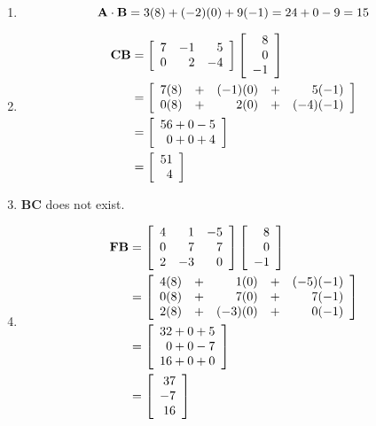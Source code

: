 \documentclass[12pt]{article}
\begin{document}
\begin{enumerate}
\item $$\textrm{\textbf{A}} \cdot \textrm{\textbf{B}} = 3(8) + (-2)(0) + 9(-1) = 24 + 0 - 9 = 15$$

\item \begin{align*} \textrm{\textbf{CB}} &= \left[\begin{array}{rrr} 7 & -1 & 5 \\ 0 & 2 & -4\end{array}\right] \left[\begin{array}{r}8\\0\\-1\end{array}\right]\\
&= \left[\begin{array}{rrrrr} 7(8) & + & (-1)(0) & + & 5(-1) \\ 0(8) & + & 2(0) & + & (-4)(-1)\end{array}\right]\\
&= \left[\begin{array}{r} 56 + 0 - 5 \\ 0 + 0 + 4\end{array}\right]\\
&= \left[\begin{array}{r} 51 \\ 4\end{array}\right]\\
\end{align*}

\item \textbf{BC} does not exist.

\item \begin{align*}
\textrm{\textbf{FB}} &= \left[\begin{array}{rrr} 4 & 1 & -5\\0 & 7 & 7\\2 & -3 & 0\end{array}\right] \left[\begin{array}{r} 8\\0\\-1\end{array}\right]\\
&= \left[\begin{array}{rrrrr} 4(8) & + & 1(0) & + & (-5)(-1)\\ 0(8) & + & 7(0) & + & 7(-1) \\ 2(8) & + & (-3)(0) & + & 0(-1)\end{array}\right]\\
&= \left[\begin{array}{r} 32 + 0 + 5\\0+0-7\\16+0+0\end{array}\right]\\
&= \left[\begin{array}{r} 37 \\ -7 \\ 16 \end{array}\right]
\end{align*}


\end{enumerate}
\end{document}
